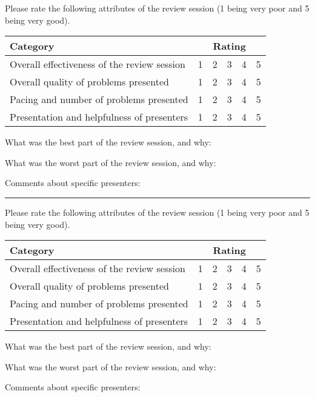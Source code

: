 \documentclass[10pt]{article}
\begin{document}
Please rate the following attributes of the review session (1 being very poor and 5 being very good).

\vspace{0.1cm}
\begin{tabular}{ | l | c | c | c | c | c | }
  \hline
  \textbf{Category} & \multicolumn{5}{c|}{\textbf{Rating}} \\
  \hline
  Overall effectiveness of the review session & 1 & 2 & 3 & 4 & 5 \\
  \hline
  Overall quality of problems presented & 1 & 2 & 3 & 4 & 5 \\
  \hline
  Pacing and number of problems presented & 1 & 2 & 3 & 4 & 5 \\
  \hline
  Presentation and helpfulness of presenters & 1 & 2 & 3 & 4 & 5 \\
  \hline
\end{tabular}
\vspace{0.5cm}

What was the best part of the review session, and why:\\
\vspace{1.75cm}

What was the worst part of the review session, and why:\\
\vspace{1.75cm}

Comments about specific presenters:
\vspace{3.5cm}
\hrule
\vspace{0.5cm}
Please rate the following attributes of the review session (1 being very poor and 5 being very good).

\vspace{0.1cm}
\begin{tabular}{ | l | c | c | c | c | c | }
  \hline
  \textbf{Category} & \multicolumn{5}{c|}{\textbf{Rating}} \\
  \hline
  Overall effectiveness of the review session & 1 & 2 & 3 & 4 & 5 \\
  \hline
  Overall quality of problems presented & 1 & 2 & 3 & 4 & 5 \\
  \hline
  Pacing and number of problems presented & 1 & 2 & 3 & 4 & 5 \\
  \hline
  Presentation and helpfulness of presenters & 1 & 2 & 3 & 4 & 5 \\
  \hline
\end{tabular}
\vspace{0.5cm}

What was the best part of the review session, and why:\\
\vspace{1.75cm}

What was the worst part of the review session, and why:\\
\vspace{1.75cm}

Comments about specific presenters:
\vspace{1.5cm}
\end{document}

